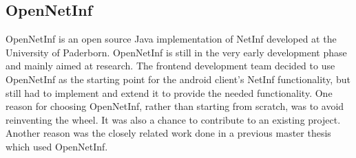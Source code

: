 \subsection{OpenNetInf}
OpenNetInf \cite{opennetinf} is an open source Java implementation of NetInf developed at the University of Paderborn. OpenNetInf is still in the very early development phase and mainly aimed at research. The frontend development team decided to use OpenNetInf as the starting point for the android client's NetInf functionality, but still had to implement and extend it to provide the needed functionality. One reason for choosing OpenNetInf, rather than starting from scratch, was to avoid reinventing the wheel. It was also a chance to contribute to an existing project. Another reason was the closely related work done in a previous master thesis \cite{hugomiguel} which used OpenNetInf.
